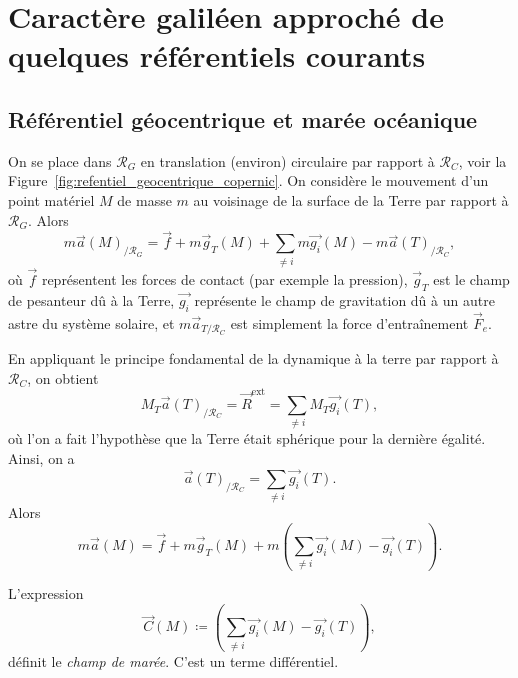 \section[Caractère galiléen de certains référentiels]{Caractère galiléen approché de quelques référentiels courants}

    \subsection{Référentiel géocentrique et marée océanique}

        On se place dans $\mathcal{R}_{G}$ en translation (environ) circulaire par rapport à $\mathcal{R}_{C}$, voir la Figure~\ref{fig:refentiel_geocentrique_copernic}. On considère le mouvement d'un point matériel $M$ de masse $m$ au voisinage de la surface de la Terre par rapport à $\mathcal{R}_{G}$. Alors 
        \begin{equation*}
            m\vec{a}(M)_{/\mathcal{R}_{G}}=\vec{f}+m\vec{g}_{T}(M)+\sum_{\neq i}m\vec{g_i}(M)-m\vec{a}(T)_{/\mathcal{R}_C},
        \end{equation*}
        où $\vec{f}$ représentent les forces de contact (par exemple la pression), $\vec{g}_{T}$ est le champ de pesanteur dû à la Terre, $\vec{g_i}$ représente le champ de gravitation dû à un autre astre du système solaire, et $m\vec{a}_{T/\mathcal{R}_{C}}$ est simplement la force d'entraînement $\vec{F}_{e}$.

        En appliquant le principe fondamental de la dynamique à la terre par rapport à $\mathcal{R}_{C}$, on obtient 
        \begin{equation*}
            M_{T}\vec{a}(T)_{/\mathcal{R}_{C}}=\vec{R}^{\text{ext}}=\sum_{\neq i}M_T\vec{g_i}(T),
        \end{equation*}
        où l'on a fait l'hypothèse que la Terre était sphérique pour la dernière égalité. Ainsi, on a 
        \begin{equation*}
            \vec{a}(T)_{/\mathcal{R}_C}=\sum_{\neq i}\vec{g_i}(T).
        \end{equation*}
        Alors 
        \begin{equation*}
            \boxed{m\vec{a}(M)=\vec{f}+m\vec{g}_{T}(M)+m\left(\sum_{\neq i}\vec{g_i}(M)-\vec{g_i}(T)\right).}
        \end{equation*}

        \begin{definition}
            L'expression
            \begin{equation*}
                \vec{C}(M)\coloneqq\left(\sum_{\neq i}\vec{g_i}(M)-\vec{g_i}(T)\right),
            \end{equation*}
            définit le \textit{champ de marée}. C'est un terme différentiel.
        \end{definition}

